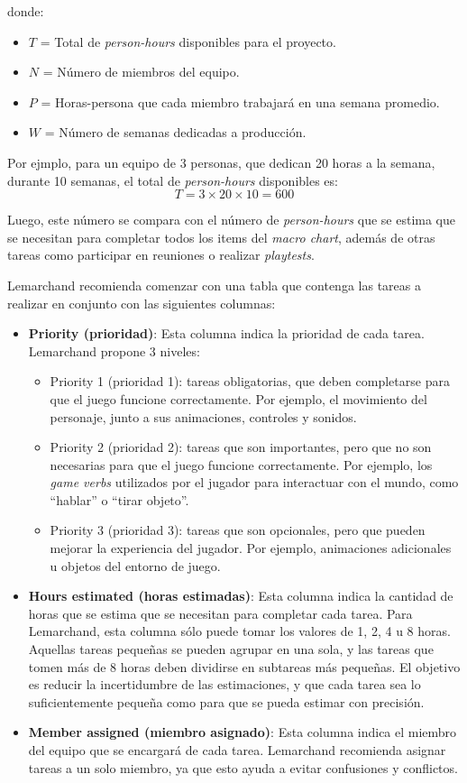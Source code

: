 donde:
\begin{itemize}
    \item $T$ = Total de \textit{person-hours} disponibles para el proyecto.
    \item $N$ = Número de miembros del equipo.
    \item $P$ = Horas-persona que cada miembro trabajará en una semana promedio.
    \item $W$ = Número de semanas dedicadas a producción.
\end{itemize}
\par Por ejmplo, para un equipo de 3 personas, que dedican 20 horas a la semana, durante 10 semanas, el total de \textit{person-hours} disponibles es:
\begin{equation}
    T = 3 \times 20 \times 10 = 600
\end{equation}
\par Luego, este número se compara con el número de \textit{person-hours} que se estima que se necesitan para completar todos los items del \textit{macro chart}, además de otras tareas como participar en reuniones o realizar \textit{playtests}.
\par Lemarchand recomienda comenzar con una tabla que contenga las tareas a realizar en conjunto con las siguientes columnas:
\begin{itemize}
    \item \textbf{Priority (prioridad)}: Esta columna indica la prioridad de cada tarea. Lemarchand propone 3 niveles:
    \begin{itemize}
        \item Priority 1 (prioridad 1): tareas obligatorias, que deben completarse para que el juego funcione correctamente. Por ejemplo, el movimiento del personaje, junto a sus animaciones, controles y sonidos.
        \item Priority 2 (prioridad 2): tareas que son importantes, pero que no son necesarias para que el juego funcione correctamente. Por ejemplo, los \textit{game verbs} utilizados por el jugador para interactuar con el mundo, como ``hablar'' o ``tirar objeto''.
        \item Priority 3 (prioridad 3): tareas que son opcionales, pero que pueden mejorar la experiencia del jugador. Por ejemplo, animaciones adicionales u objetos del entorno de juego.  
    \end{itemize}
    \item \textbf{Hours estimated (horas estimadas)}: Esta columna indica la cantidad de horas que se estima que se necesitan para completar cada tarea. Para Lemarchand, esta columna sólo puede tomar los valores de 1, 2, 4 u 8 horas. Aquellas tareas pequeñas se pueden agrupar en una sola, y las tareas que tomen más de 8 horas deben dividirse en subtareas más pequeñas. El objetivo es reducir la incertidumbre de las estimaciones, y que cada tarea sea lo suficientemente pequeña como para que se pueda estimar con precisión. 
    \item \textbf{Member assigned (miembro asignado)}: Esta columna indica el miembro del equipo que se encargará de cada tarea. Lemarchand recomienda asignar tareas a un solo miembro, ya que esto ayuda a evitar confusiones y conflictos.
\end{itemize} 
